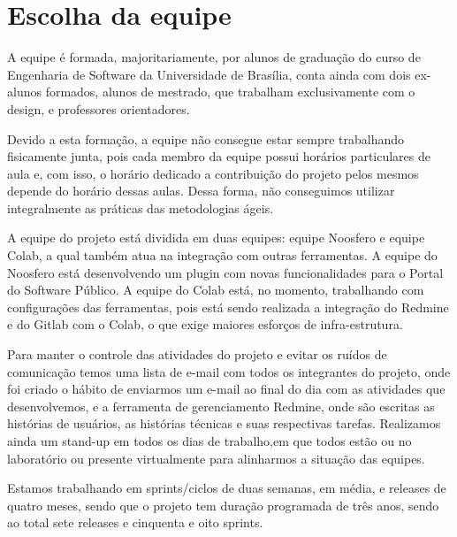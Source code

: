 \section{Escolha da equipe}
\label{sec:equipe}

	A equipe é formada, majoritariamente, por alunos de graduação do curso de Engenharia de Software da Universidade de Brasília, conta ainda com dois ex-alunos formados, alunos de mestrado, que trabalham exclusivamente com o design, e professores orientadores. 
	
	Devido a esta formação, a equipe não consegue estar sempre trabalhando fisicamente junta, pois cada membro da equipe possui horários particulares de aula e, com isso, o horário dedicado a contribuição do projeto pelos mesmos depende do horário dessas aulas. Dessa forma, não conseguimos utilizar integralmente as práticas das metodologias ágeis.
	
	A equipe do projeto está dividida em duas equipes: equipe Noosfero e equipe Colab, a qual também atua na integração com outras ferramentas. A equipe do Noosfero está desenvolvendo um plugin com novas funcionalidades para o Portal do Software Público. A equipe do Colab está, no momento, trabalhando com configurações das ferramentas, pois está sendo realizada a integração do Redmine e do Gitlab com o Colab, o que exige maiores esforços de infra-estrutura.
	
	Para manter o controle das atividades do projeto e evitar os ruídos de comunicação temos uma lista de e-mail com todos os integrantes do projeto, onde foi criado o hábito de enviarmos um e-mail ao final do dia com as atividades que desenvolvemos, e a ferramenta de gerenciamento Redmine, onde são escritas as histórias de usuários, as histórias técnicas e suas respectivas tarefas. Realizamos ainda um stand-up em todos os dias de trabalho,em que todos estão ou no laboratório ou presente virtualmente para alinharmos a situação das equipes. 
	
	Estamos trabalhando em sprints/ciclos de duas semanas, em média, e releases de quatro meses, sendo que o projeto tem duração programada de três anos, sendo ao total sete releases e cinquenta e oito sprints.